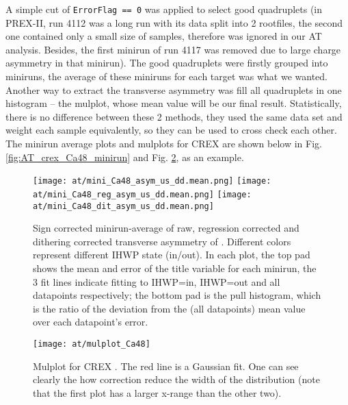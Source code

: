 A simple cut of \verb|ErrorFlag == 0| was applied to select good quadruplets 
(in PREX-II, run 4112 was a long run with its data split into 2 rootfiles, the
second one contained only a small size of samples, therefore was ignored in our AT analysis.
Besides, the first minirun of run 4117 was removed due to large charge asymmetry
in that minirun). The good quadruplets were firstly grouped into miniruns, 
the average of these miniruns for each target was what we wanted. 
Another way to extract the transverse asymmetry was fill 
all quadruplets in one histogram -- the mulplot, whose mean value will be
our final result. Statistically, there is no difference between these 2 methods,
they used the same data set and weight each sample equivalently, so they can
be used to cross check each other. The minirun average plots and mulplots for
CREX \Ca are shown below in Fig. \ref{fig:AT_crex_Ca48_minirun} and 
Fig. \ref{fig:AT_crex_Ca48_mulplot}, as an example.

\begin{figure}[H]
    \centering
    \texttt{[image: at/mini\_Ca48\_asym\_us\_dd.mean.png]}
    \texttt{[image: at/mini\_Ca48\_reg\_asym\_us\_dd.mean.png]}
    \texttt{[image: at/mini\_Ca48\_dit\_asym\_us\_dd.mean.png]}
    \caption{Sign corrected minirun-average of raw, regression corrected and 
    dithering corrected transverse asymmetry of \Ca. Different colors represent
    different IHWP state (in/out). In each plot, the top pad shows the 
    mean and error of the title variable for each minirun, the 3 fit lines indicate
    fitting to IHWP=in, IHWP=out and all datapoints respectively;
    the bottom pad is the pull histogram, which is the ratio of the deviation 
    from the (all datapoints) mean value over each datapoint's error.
    }
    \label{fig:AT_crex_Ca48_miniruns}
\end{figure}

\begin{figure}[H]
    \centering
    \texttt{[image: at/mulplot\_Ca48]}
    \caption{Mulplot for CREX \Ca. The red line is a Gaussian fit. One can see 
    clearly the how correction reduce the width of the distribution (note that
    the first plot has a larger x-range than the other two).}
    \label{fig:AT_crex_Ca48_mulplot}
\end{figure}

